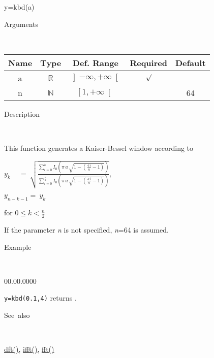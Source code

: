 y=kbd(a)

\begin{description}
\item [Arguments]~
\end{description}
\begin{tabular}{|c|c|c|c|c|}
\hline 
Name&
Type&
Def. Range&
Required&
Default\tabularnewline
\hline
\hline 
a&
$\mathbb{R}$&
$\left]-\infty,+\infty\right[$&
$\surd$&
\tabularnewline
\hline 
n&
$\mathbb{N}$&
$\left[1,+\infty\right[$&
&
64\tabularnewline
\hline
\end{tabular}

\begin{description}
\item [Description]~
\end{description}
This function generates a Kaiser-Bessel window according to

\medskip{}
$y_{k}\quad\,=\:{\displaystyle \sqrt{\frac{\sum\limits _{i=0}^{k}I_{0}\left(\pi\, a\,\sqrt{1-\left(\frac{4\, i}{n}-1\right)}\right)}{\sum\limits _{i=0}^{\frac{n}{2}}I_{0}\left(\pi\, a\,\sqrt{1-\left(\frac{4\, i}{n}-1\right)}\right)}}}$,
\medskip{}

$y_{n-k-1}=\: y_{k}$
\medskip{}

for $0\leq k<\frac{n}{2}$
\medskip{}

If the parameter \textit{n} is not specified, \textit{n}=64
is assumed.

\begin{description}
\item [Example]~
\end{description}
\begin{lyxlist}{00.00.0000}
\item [\texttt{y=kbd(0.1,4)}]returns .
\end{lyxlist}
\begin{description}
\item [See~also]~
\end{description}
\textcolor{blue}{\hyperlink{dft}{dft()}}\textcolor{black}{,} \textcolor{blue}{\hyperlink{ifft}{ifft()}}\textcolor{black}{,}
\textcolor{blue}{\hyperlink{fft}{fft()}}
